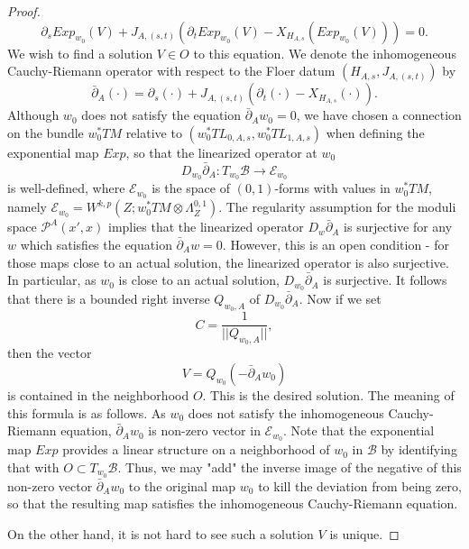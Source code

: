 \documentclass{amsart}
\numberwithin{equation}{section}
\numberwithin{figure}{section}
\begin{document}
\begin{proof}
\begin{equation}
\partial_{s} Exp_{w_{0}}(V) + J_{A, (s, t)}(\partial_{t} Exp_{w_{0}}(V) - X_{H_{A, s}}(Exp_{w_{0}}(V))) = 0.
\end{equation}
We wish to find a solution $V \in O$ to this equation. We denote the inhomogeneous Cauchy-Riemann operator with respect to the Floer datum $(H_{A, s}, J_{A, (s, t)})$ by
\begin{equation*}
\bar{\partial}_{A}(\cdot) = \partial_{s}(\cdot) + J_{A, (s, t)}(\partial_{t}(\cdot) - X_{H_{A, s}}(\cdot)).
\end{equation*}
Although $w_{0}$ does not satisfy the equation $\bar{\partial}_{A} w_{0} = 0$, we have chosen a connection on the bundle $w_{0}^{*}TM$ relative to $(w_{0}^{*}TL_{0, A, s}, w_{0}^{*}TL_{1, A, s})$ when defining the exponential map $Exp$, so that the linearized operator at $w_{0}$
\begin{equation}
D_{w_{0}} \bar{\partial}_{A}: T_{w_{0}}\mathcal{B} \to \mathcal{E}_{w_{0}}
\end{equation}
is well-defined, where $\mathcal{E}_{w_{0}}$ is the space of $(0, 1)$-forms with values in $w_{0}^{*}TM$, namely $\mathcal{E}_{w_{0}} = W^{k, p}(Z; w_{0}^{*}TM \otimes \Lambda^{0,1}_{Z})$.
The regularity assumption for the moduli space $\mathcal{P}^{A}(x', x)$ implies that the linearized operator $D_{w}\bar{\partial}_{A}$ is surjective for any $w$ which satisfies the equation $\bar{\partial}_{A} w = 0$. However, this is an open condition - for those maps close to an actual solution, the linearized operator is also surjective. In particular, as $w_{0}$ is close to an actual solution, $D_{w_{0}}\bar{\partial}_{A}$ is surjective. It follows that there is a bounded right inverse $Q_{w_{0}, A}$ of $D_{w_{0}} \bar{\partial}_{A}$. Now if we set
\begin{equation*}
C = \frac{1}{||Q_{w_{0}, A}||},
\end{equation*}
then the vector
\begin{equation}
V = Q_{w_{0}}(-\bar{\partial}_{A} w_{0})
\end{equation}
is contained in the neighborhood $O$. This is the desired solution.
The meaning of this formula is as follows. As $w_{0}$ does not satisfy the inhomogeneous Cauchy-Riemann equation, $\bar{\partial}_{A} w_{0}$ is non-zero vector in $\mathcal{E}_{w_{0}}$. Note that the exponential map $Exp$ provides a linear structure on a neighborhood of $w_{0}$ in $\mathcal{B}$ by identifying that with $O \subset T_{w_{0}}\mathcal{B}$. Thus, we may "add" the inverse image of the negative of this non-zero vector $\bar{\partial}_{A} w_{0}$ to the original map $w_{0}$ to kill the deviation from being zero, so that the resulting map satisfies the inhomogeneous Cauchy-Riemann equation. \par
	On the other hand, it is not hard to see such a solution $V$ is unique. \par
\end{proof}
\end{document}
